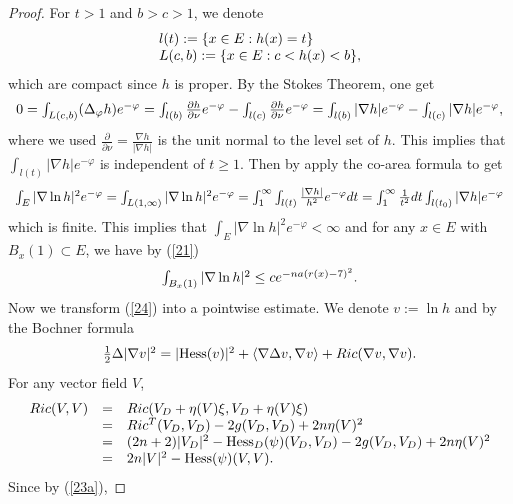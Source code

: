 \documentclass[12pt]{amsart}%
\numberwithin{equation}{section}
\begin{document}
\begin{proof}
For $t>1$ and $b>c>1$, we denote
\[%
\begin{array}
[c]{l}%
l(t):=\{x\in E:h(x)=t\}\\
L(c,b):=\{x\in E:c<h(x)<b\},
\end{array}
\]
which are compact since $h$ is proper. By the Stokes Theorem, one get
\[%
\begin{array}
[c]{c}%
0=\int_{L(c,b)}(\Delta_{\varphi}h)e^{-\varphi}=\int_{l(b)}\frac{\partial
h}{\partial\nu}e^{-\varphi}-\int_{l(c)}\frac{\partial h}{\partial\nu
}e^{-\varphi}=\int_{l(b)}|\nabla h|e^{-\varphi}-\int_{l(c)}|\nabla
h|e^{-\varphi},
\end{array}
\]
where we used $\frac{\partial}{\partial\nu}=\frac{\nabla h}{|\nabla h|}$ is
the unit normal to the level set of $h$. This implies that $\int_{l(t)}|\nabla
h|e^{-\varphi}$ is independent of $t\geq1$. Then by apply the co-area formula
to get
\[%
\begin{array}
[c]{c}%
\int_{E}|\nabla\ln h|^{2}e^{-\varphi}=\int_{L(1,\infty)}|\nabla\ln
h|^{2}e^{-\varphi}=\int_{1}^{\infty}\int_{l(t)}\frac{|\nabla h|}{h^{2}%
}e^{-\varphi}dt=\int_{1}^{\infty}\frac{1}{t^{2}}dt\int_{l(t_{0})}|\nabla
h|e^{-\varphi}%
\end{array}
\]
which is finite. This implies that $\int_{E}|\nabla\ln h|^{2}e^{-\varphi
}<\infty$ and for any $x\in E$ with $B_{x}(1)\subset E$, we have by (\ref{21})%
\begin{equation}%
\begin{array}
[c]{c}%
\int_{B_{x}(1)}|\nabla\ln h|^{2}\leq ce^{-na(r(x)-7)^{2}}.
\end{array}
\label{24}%
\end{equation}
Now we transform (\ref{24}) into a pointwise estimate. We denote $v:=\ln h$
and by the Bochner formula%
\[%
\begin{array}
[c]{c}%
\frac{1}{2}\Delta|\nabla v|^{2}=|\mathrm{Hess}(v)|^{2}+\left\langle
\nabla\Delta v,\nabla v\right\rangle +Ric(\nabla v,\nabla v).
\end{array}
\]
For any vector field $V$,%
\[%
\begin{array}
[c]{lll}%
Ric(V,V) & = & Ric(V_{D}+\eta(V)\xi,V_{D}+\eta(V)\xi)\\
& = & Ric^{T}(V_{D},V_{D})-2g(V_{D},V_{D})+2n\eta(V)^{2}\\
& = & (2n+2)|V_{D}|^{2}-\mathrm{Hess}_{D}(\psi)(V_{D},V_{D})-2g(V_{D}%
,V_{D})+2n\eta(V)^{2}\\
& = & 2n|V|^{2}-\mathrm{Hess}(\psi)(V,V).
\end{array}
\]
Since by (\ref{23a}),%

\end{proof}
\end{document}

